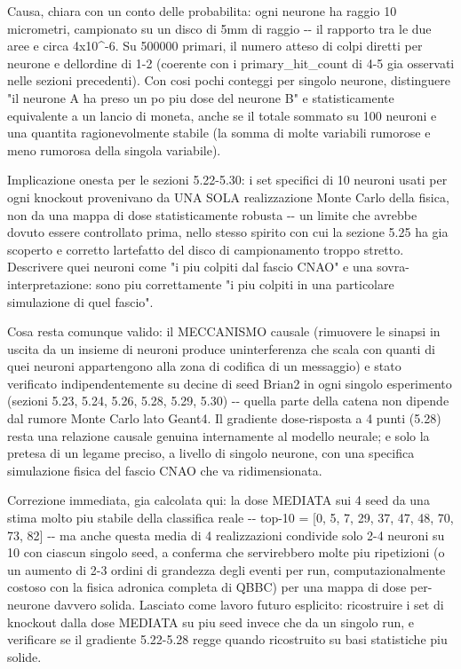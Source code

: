 \documentclass[
  italian,
]{article}
\begin{document}
Causa, chiara con un conto delle probabilita\textquotesingle: ogni neurone ha raggio 10 micrometri, campionato su un disco di 5mm di raggio -\/- il rapporto tra le due aree e\textquotesingle{} circa 4x10\^{}-6. Su 500000 primari, il numero atteso di colpi diretti per neurone e\textquotesingle{} dell\textquotesingle ordine di 1-2 (coerente con i primary\_\allowbreak{}hit\_\allowbreak{}count di 4-5 gia\textquotesingle{} osservati nelle sezioni precedenti). Con cosi\textquotesingle{} pochi conteggi per singolo neurone, distinguere "il neurone A ha preso un po\textquotesingle{} piu\textquotesingle{} dose del neurone B" e\textquotesingle{} statisticamente equivalente a un lancio di moneta, anche se il totale sommato su 100 neuroni e\textquotesingle{} una quantita\textquotesingle{} ragionevolmente stabile (la somma di molte variabili rumorose e\textquotesingle{} meno rumorosa della singola variabile).

Implicazione onesta per le sezioni 5.22-5.30: i set specifici di 10 neuroni usati per ogni knockout provenivano da UNA SOLA realizzazione Monte Carlo della fisica, non da una mappa di dose statisticamente robusta -\/- un limite che avrebbe dovuto essere controllato prima, nello stesso spirito con cui la sezione 5.25 ha gia\textquotesingle{} scoperto e corretto l\textquotesingle artefatto del disco di campionamento troppo stretto. Descrivere quei neuroni come "i piu\textquotesingle{} colpiti dal fascio CNAO" e\textquotesingle{} una sovra-interpretazione: sono piu\textquotesingle{} correttamente "i piu\textquotesingle{} colpiti in una particolare simulazione di quel fascio".

Cosa resta comunque valido: il MECCANISMO causale (rimuovere le sinapsi in uscita da un insieme di neuroni produce un\textquotesingle interferenza che scala con quanti di quei neuroni appartengono alla zona di codifica di un messaggio) e\textquotesingle{} stato verificato indipendentemente su decine di seed Brian2 in ogni singolo esperimento (sezioni 5.23, 5.24, 5.26, 5.28, 5.29, 5.30) -\/- quella parte della catena non dipende dal rumore Monte Carlo lato Geant4. Il gradiente dose-risposta a 4 punti (5.28) resta una relazione causale genuina internamente al modello neurale; e\textquotesingle{} solo la pretesa di un legame preciso, a livello di singolo neurone, con una specifica simulazione fisica del fascio CNAO che va ridimensionata.

Correzione immediata, gia\textquotesingle{} calcolata qui: la dose MEDIATA sui 4 seed da\textquotesingle{} una stima molto piu\textquotesingle{} stabile della classifica reale -\/- top-10 = {[}0, 5, 7, 29, 37, 47, 48, 70, 73, 82{]} -\/- ma anche questa media di 4 realizzazioni condivide solo 2-4 neuroni su 10 con ciascun singolo seed, a conferma che servirebbero molte piu\textquotesingle{} ripetizioni (o un aumento di 2-3 ordini di grandezza degli eventi per run, computazionalmente costoso con la fisica adronica completa di QBBC) per una mappa di dose per-neurone davvero solida. Lasciato come lavoro futuro esplicito: ricostruire i set di knockout dalla dose MEDIATA su piu\textquotesingle{} seed invece che da un singolo run, e verificare se il gradiente 5.22-5.28 regge quando ricostruito su basi statistiche piu\textquotesingle{} solide.
\end{document}
